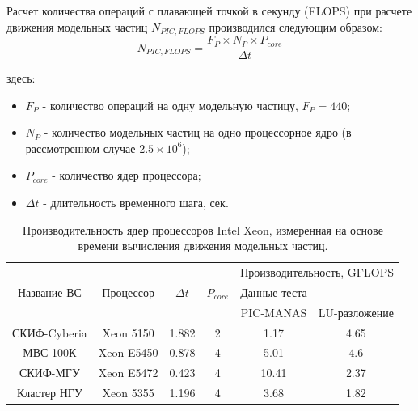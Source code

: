 Расчет количества операций с плавающей точкой в секунду (FLOPS) при расчете движения модельных частиц $N_{PIC,FLOPS}$ производился следующим образом:
\begin{equation}
N_{PIC,FLOPS} = \frac{F_P\times N_P \times P_{core}}{\Delta t}
\label{PIC_FLOPS}
\end{equation}

здесь:
\begin{itemize}
	\item $F_P$ - количество операций на одну модельную частицу, $F_P = 440$;
	\item $N_P$ - количество модельных частиц на одно процессорное ядро (в рассмотренном случае $2.5\times 10^6$);  
	\item $P_{core}$ - количество ядер процессора;
	\item $\Delta t$  - длительность временного шага, сек.
\end{itemize}	

\begin{table}[ht]
	\caption{Производительность ядер процессоров Intel Xeon, измеренная на основе времени вычисления движения модельных частиц.}
	\label{PIC_vs_LU}
	\begin{tabular}{|c|c|c|c|c|c|}
		\hline
		&            &            &             &       \multicolumn{2}{|c|}{Производительность, GFLOPS} \\ \cline{5-6}  	
		Название ВС  & Процессор  &  $\Delta t$ &$P_{core}$ & Данные теста  &  \\
		             &            &             &           & PIC-MANAS     & LU-разложение \\ \hline
		СКИФ-Cyberia & Xeon 5150  &  1.882      & 2     &  1.17          & 4.65    \\ \hline
		МВС-100К     & Xeon E5450 &  0.878      & 4     & 5.01           & 4.6     \\ \hline 
		СКИФ-МГУ     & Xeon E5472 &  0.423      & 4     & 10.41          & 2.37       \\ \hline     
		Кластер НГУ  & Xeon 5355  &  1.196      & 4     & 3.68           & 1.82       \\ \hline
	\end{tabular}	
\end{table}






